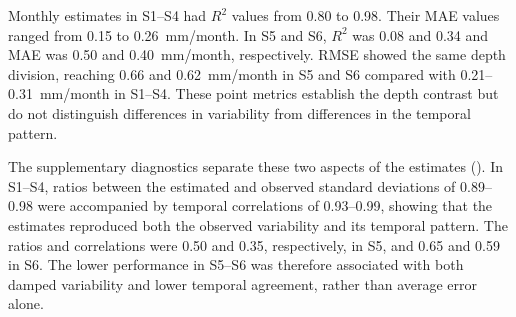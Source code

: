 Monthly estimates in S1--S4 had $R^2$ values from 0.80 to 0.98. Their MAE values ranged from 0.15 to 0.26~mm/month. In S5 and S6, $R^2$ was 0.08 and 0.34 and MAE was 0.50 and 0.40~mm/month, respectively. RMSE showed the same depth division, reaching 0.66 and 0.62~mm/month in S5 and S6 compared with 0.21--0.31~mm/month in S1--S4. These point metrics establish the depth contrast but do not distinguish differences in variability from differences in the temporal pattern.

The supplementary diagnostics separate these two aspects of the estimates (). In S1--S4, ratios between the estimated and observed standard deviations of 0.89--0.98 were accompanied by temporal correlations of 0.93--0.99, showing that the estimates reproduced both the observed variability and its temporal pattern. The ratios and correlations were 0.50 and 0.35, respectively, in S5, and 0.65 and 0.59 in S6. The lower performance in S5--S6 was therefore associated with both damped variability and lower temporal agreement, rather than average error alone.

